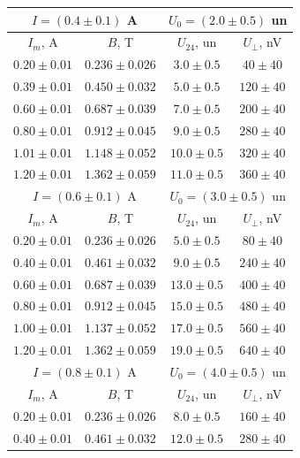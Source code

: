 \documentclass[12pt,a4paper]{scrartcl}
\begin{document}
	\begin{center}
		\begin{tabular}{|c|c|c|c|}
			\hline
			\multicolumn{2}{|c|}{$I = (0.4 \pm 0.1)$ A} & \multicolumn{2}{|c|}{$U_0 = (2.0 \pm 0.5)$ un}
			\\\hline
			$I_m$, A & $B$, T & $U_{24}$, un & $U_\perp$, nV
			\\\hline
			$0.20 \pm 0.01$ & $0.236 \pm 0.026$ & $3.0 \pm 0.5$ & $40 \pm 40$
			\\\hline
			$0.39 \pm 0.01$ & $0.450 \pm 0.032$ & $5.0 \pm 0.5$ & $120 \pm 40$
			\\\hline
			$0.60 \pm 0.01$ & $0.687 \pm 0.039$ & $7.0 \pm 0.5$ & $200 \pm 40$
			\\\hline
			$0.80 \pm 0.01$ & $0.912 \pm 0.045$ & $9.0 \pm 0.5$ & $280 \pm 40$
			\\\hline
			$1.01 \pm 0.01$ & $1.148 \pm 0.052$ & $10.0 \pm 0.5$ & $320 \pm 40$
			\\\hline
			$1.20 \pm 0.01$ & $1.362 \pm 0.059$ & $11.0 \pm 0.5$ & $360 \pm 40$
			\\\hline
			\multicolumn{2}{|c|}{$I = (0.6 \pm 0.1)$ A} & \multicolumn{2}{|c|}{$U_0 = (3.0 \pm 0.5)$ un}
			\\\hline
			$I_m$, A & $B$, T & $U_{24}$, un & $U_\perp$, nV
			\\\hline
			$0.20 \pm 0.01$ & $0.236 \pm 0.026$ & $5.0 \pm 0.5$ & $80 \pm 40$
			\\\hline
			$0.40 \pm 0.01$ & $0.461 \pm 0.032$ & $9.0 \pm 0.5$ & $240 \pm 40$
			\\\hline
			$0.60 \pm 0.01$ & $0.687 \pm 0.039$ & $13.0 \pm 0.5$ & $400 \pm 40$
			\\\hline
			$0.80 \pm 0.01$ & $0.912 \pm 0.045$ & $15.0 \pm 0.5$ & $480 \pm 40$
			\\\hline
			$1.00 \pm 0.01$ & $1.137 \pm 0.052$ & $17.0 \pm 0.5$ & $560 \pm 40$
			\\\hline
			$1.20 \pm 0.01$ & $1.362 \pm 0.059$ & $19.0 \pm 0.5$ & $640 \pm 40$
			\\\hline
			\multicolumn{2}{|c|}{$I = (0.8 \pm 0.1)$ A} & \multicolumn{2}{|c|}{$U_0 = (4.0 \pm 0.5)$ un}
			\\\hline
			$I_m$, A & $B$, T & $U_{24}$, un & $U_\perp$, nV
			\\\hline
			$0.20 \pm 0.01$ & $0.236 \pm 0.026$ & $8.0 \pm 0.5$ & $160 \pm 40$
			\\\hline
			$0.40 \pm 0.01$ & $0.461 \pm 0.032$ & $12.0 \pm 0.5$ & $280 \pm 40$
			\\\hline

\end{tabular}
\end{center}
\end{document}
